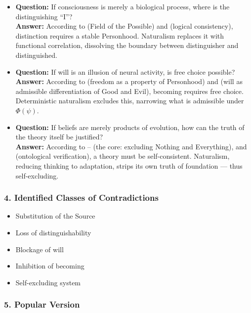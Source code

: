 \documentclass[12pt]{article}
\begin{document}
\begin{itemize}
\item \textbf{Question:} If consciousness is merely a biological process, where is the distinguishing ``I''?  
\\ \textbf{Answer:} According to \text{[4]} (Field of the Possible) and \text{[11.1]} (logical consistency), distinction requires a stable Personhood. Naturalism replaces it with functional correlation, dissolving the boundary between distinguisher and distinguished.

\item \textbf{Question:} If will is an illusion of neural activity, is free choice possible?  
\\ \textbf{Answer:} According to \text{[12.2]} (freedom as a property of Personhood) and \text{[11.3]} (will as admissible differentiation of Good and Evil), becoming requires free choice. Deterministic naturalism excludes this, narrowing what is admissible under $\Phi(\psi)$.

\item \textbf{Question:} If beliefs are merely products of evolution, how can the truth of the theory itself be justified?  
\\ \textbf{Answer:} According to \text{[1]}–\text{[3]} (the core: excluding Nothing and Everything), and \text{[11.1.1.4]} (ontological verification), a theory must be self-consistent. Naturalism, reducing thinking to adaptation, strips its own truth of foundation — thus self-excluding.
\end{itemize}

\subsubsection*{4. Identified Classes of Contradictions}

\begin{itemize}
\item Substitution of the Source
\item Loss of distinguishability
\item Blockage of will
\item Inhibition of becoming
\item Self-excluding system
\end{itemize}

\subsubsection*{5. Popular Version}
\end{document}
